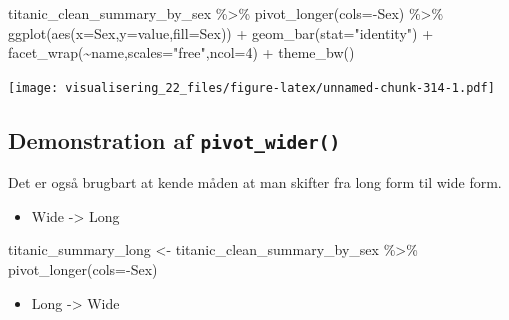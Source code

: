\documentclass[
]{book}
\newenvironment{Shaded}{\begin{snugshade}}{\end{snugshade}}
\newcommand{\AttributeTok}[1]{\textcolor[rgb]{0.77,0.63,0.00}{#1}}
\newcommand{\DecValTok}[1]{\textcolor[rgb]{0.00,0.00,0.81}{#1}}
\newcommand{\FunctionTok}[1]{\textcolor[rgb]{0.00,0.00,0.00}{#1}}
\newcommand{\NormalTok}[1]{#1}
\newcommand{\OtherTok}[1]{\textcolor[rgb]{0.56,0.35,0.01}{#1}}
\newcommand{\SpecialCharTok}[1]{\textcolor[rgb]{0.00,0.00,0.00}{#1}}
\newcommand{\StringTok}[1]{\textcolor[rgb]{0.31,0.60,0.02}{#1}}
\providecommand{\tightlist}{%
  \setlength{\itemsep}{0pt}\setlength{\parskip}{0pt}}
\begin{document}
\begin{Shaded}
\begin{Highlighting}[]
\NormalTok{titanic\_clean\_summary\_by\_sex }\SpecialCharTok{\%\textgreater{}\%} 
  \FunctionTok{pivot\_longer}\NormalTok{(}\AttributeTok{cols=}\SpecialCharTok{{-}}\NormalTok{Sex) }\SpecialCharTok{\%\textgreater{}\%}
  \FunctionTok{ggplot}\NormalTok{(}\FunctionTok{aes}\NormalTok{(}\AttributeTok{x=}\NormalTok{Sex,}\AttributeTok{y=}\NormalTok{value,}\AttributeTok{fill=}\NormalTok{Sex)) }\SpecialCharTok{+} 
  \FunctionTok{geom\_bar}\NormalTok{(}\AttributeTok{stat=}\StringTok{"identity"}\NormalTok{) }\SpecialCharTok{+} 
  \FunctionTok{facet\_wrap}\NormalTok{(}\SpecialCharTok{\textasciitilde{}}\NormalTok{name,}\AttributeTok{scales=}\StringTok{"free"}\NormalTok{,}\AttributeTok{ncol=}\DecValTok{4}\NormalTok{) }\SpecialCharTok{+}  
  \FunctionTok{theme\_bw}\NormalTok{()}
\end{Highlighting}
\end{Shaded}

\texttt{[image: visualisering\_22\_files/figure-latex/unnamed-chunk-314-1.pdf]}

\hypertarget{demonstration-af-pivot_wider}{%
\subsection{\texorpdfstring{Demonstration af \texttt{pivot\_wider()}}{Demonstration af pivot\_wider()}}\label{demonstration-af-pivot_wider}}

Det er også brugbart at kende måden at man skifter fra long form til wide form.

\begin{itemize}
\tightlist
\item
  Wide -\textgreater{} Long
\end{itemize}

\begin{Shaded}
\begin{Highlighting}[]
\NormalTok{titanic\_summary\_long }\OtherTok{\textless{}{-}}\NormalTok{ titanic\_clean\_summary\_by\_sex }\SpecialCharTok{\%\textgreater{}\%} 
  \FunctionTok{pivot\_longer}\NormalTok{(}\AttributeTok{cols=}\SpecialCharTok{{-}}\NormalTok{Sex)}
\end{Highlighting}
\end{Shaded}

\begin{itemize}
\tightlist
\item
  Long -\textgreater{} Wide
\end{itemize}
\end{document}
